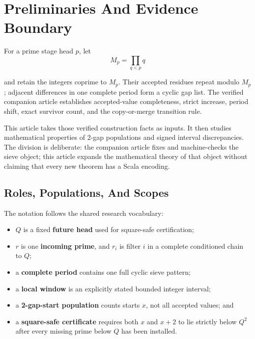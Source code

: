 \section{Preliminaries And Evidence Boundary}
\label{sec:preliminaries}

For a prime stage head $p$, let
\begin{equation*}
M_p=\prod_{q\lt p}q
\end{equation*}

and retain the integers coprime to $M_p$. Their accepted residues repeat
modulo $M_p$; adjacent differences in one complete period form a cyclic
gap list. The verified companion article establishes accepted-value
completeness, strict increase, period shift, exact survivor count, and
the copy-or-merge transition rule.

This article takes those verified construction facts as inputs. It then
studies mathematical properties of 2-gap populations and signed interval
discrepancies. The division is deliberate: the companion article fixes
and machine-checks the sieve object; this article expands the
mathematical theory of that object without claiming that every new
theorem has a Scala encoding.

\subsection{Roles, Populations, And Scopes}
\label{sec:roles-populations-scopes}

The notation follows the shared research vocabulary:

\begin{itemize}
  \item $Q$ is a fixed \textbf{future head} used for square-safe
    certification;
  \item $r$ is one \textbf{incoming prime}, and $r_i$ is filter $i$ in a
    complete conditioned chain to $Q$;
  \item a \textbf{complete period} contains one full cyclic sieve pattern;
  \item a \textbf{local window} is an explicitly stated bounded integer
    interval;
  \item a \textbf{2-gap-start population} counts starts $x$, not all
    accepted values; and
  \item a \textbf{square-safe certificate} requires both $x$ and $x+2$ to
    lie strictly below $Q^2$ after every missing prime below $Q$ has been
    installed.
\end{itemize}

